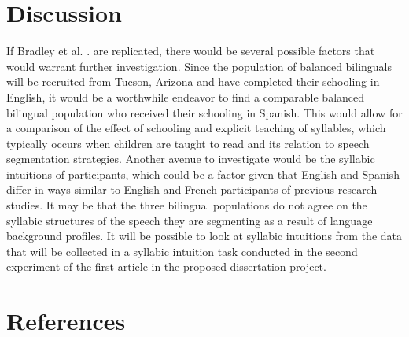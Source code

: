 
\section{Discussion}

If Bradley et al. \parencite{Bradley1993-qq}. are replicated, there would be several possible factors that would warrant further investigation. Since the population of balanced bilinguals will be recruited from Tucson, Arizona and have completed their schooling in English, it would be a worthwhile endeavor to find a comparable balanced bilingual population who received their schooling in Spanish. This would allow for a comparison of the effect of schooling and explicit teaching of syllables, which typically occurs when children are taught to read and its relation to speech segmentation strategies. 
Another avenue to investigate would be the syllabic intuitions of participants, which could be a factor given that English and Spanish differ in ways similar to English and French participants of previous research studies. It may be that the three bilingual populations do not agree on the syllabic structures of the speech they are segmenting as a result of language background profiles. It will be possible to look at syllabic intuitions from the data that will be collected in a syllabic intuition task conducted in the second experiment of the first article in the proposed dissertation project. 



\section{References}






